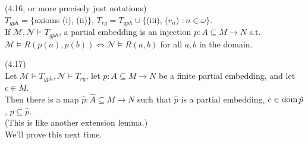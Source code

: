 \documentclass[a4paper]{article}
\begin{document}
\begin{defi} (4.16, or more precisely just notations)\\
    $T_{gph} = \{$axioms (i), (ii)$\}$, $T_{rg} = T_{gph} \cup \{$(iii), ($r_n$) $:n \in \omega\}$.\\
    If $\mathcal{M},\mathcal{N} \vDash T_{gph}$, a partial embedding is an injection $p: A \subseteq M \to N$ s.t. $\mathcal{M} \vDash R(p(a),p(b)) \iff \mathcal{N} \vDash R(a,b)$ for all $a,b$ in the domain.
\end{defi}

\begin{lemma} (4.17)\\
    Let $\mathcal{M} \vDash T_{gph},\mathcal{N} \vDash T_{rg}$, let $p:A \subseteq M \to N$ be a finite partial embedding, and let $c \in M$.\\
    Then there is a map $\hat{p}:\hat{A} \subseteq M \to N$ such that $\hat{p}$ is a partial embedding, $c \in \operatorname{dom} \hat{p}$, $p\subseteq \hat{p}$.\\
    (This is like another extension lemma.)\\
    We'll prove this next time.
\end{lemma}
\end{document}
